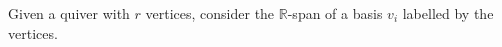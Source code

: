 Given a quiver with $r$ vertices, consider the $\mathbb{R}$-span of a
basis $v_i$ labelled by the vertices.
